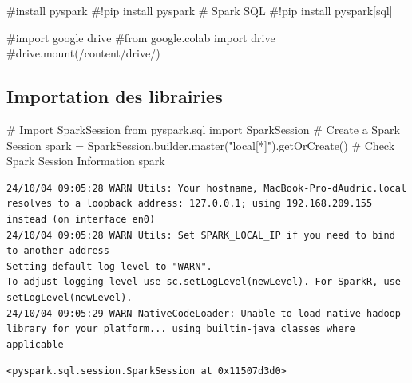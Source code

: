 \documentclass[
  letterpaper,
  DIV=11,
  numbers=noendperiod]{scrartcl}
\newenvironment{Shaded}{\begin{snugshade}}{\end{snugshade}}
\newcommand{\CommentTok}[1]{\textcolor[rgb]{0.37,0.37,0.37}{#1}}
\newcommand{\ImportTok}[1]{\textcolor[rgb]{0.00,0.46,0.62}{#1}}
\newcommand{\NormalTok}[1]{\textcolor[rgb]{0.00,0.23,0.31}{#1}}
\newcommand{\OperatorTok}[1]{\textcolor[rgb]{0.37,0.37,0.37}{#1}}
\newcommand{\StringTok}[1]{\textcolor[rgb]{0.13,0.47,0.30}{#1}}
\begin{document}
\begin{Shaded}
\begin{Highlighting}[]
\CommentTok{\#install pyspark}
\CommentTok{\#!pip install pyspark}
\CommentTok{\# Spark SQL}
\CommentTok{\#!pip install pyspark[sql]}
\end{Highlighting}
\end{Shaded}

\begin{Shaded}
\begin{Highlighting}[]
\CommentTok{\#import google drive}
\CommentTok{\#from google.colab import drive}
\CommentTok{\#drive.mount(\textquotesingle{}/content/drive/\textquotesingle{})}
\end{Highlighting}
\end{Shaded}

\subsection{Importation des
librairies}\label{importation-des-librairies}

\begin{Shaded}
\begin{Highlighting}[]
\CommentTok{\# Import SparkSession}
\ImportTok{from}\NormalTok{ pyspark.sql }\ImportTok{import}\NormalTok{ SparkSession}
\CommentTok{\# Create a Spark Session}
\NormalTok{spark }\OperatorTok{=}\NormalTok{ SparkSession.builder.master(}\StringTok{"local[*]"}\NormalTok{).getOrCreate()}
\CommentTok{\# Check Spark Session Information}
\NormalTok{spark}
\end{Highlighting}
\end{Shaded}

\begin{verbatim}
24/10/04 09:05:28 WARN Utils: Your hostname, MacBook-Pro-dAudric.local resolves to a loopback address: 127.0.0.1; using 192.168.209.155 instead (on interface en0)
24/10/04 09:05:28 WARN Utils: Set SPARK_LOCAL_IP if you need to bind to another address
Setting default log level to "WARN".
To adjust logging level use sc.setLogLevel(newLevel). For SparkR, use setLogLevel(newLevel).
24/10/04 09:05:29 WARN NativeCodeLoader: Unable to load native-hadoop library for your platform... using builtin-java classes where applicable
\end{verbatim}

\begin{verbatim}
<pyspark.sql.session.SparkSession at 0x11507d3d0>
\end{verbatim}
\end{document}
